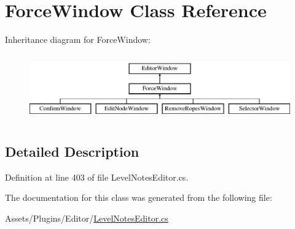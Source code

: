 \hypertarget{class_force_window}{}\section{Force\+Window Class Reference}
\label{class_force_window}
Inheritance diagram for Force\+Window\+:\begin{figure}[H]
\begin{center}
\leavevmode
\includegraphics[height=2.916667cm]{class_force_window}
\end{center}
\end{figure}


\subsection{Detailed Description}


Definition at line 403 of file Level\+Notes\+Editor.\+cs.



The documentation for this class was generated from the following file\+:\begin{DoxyCompactItemize}
\item 
Assets/\+Plugins/\+Editor/\mbox{\hyperlink{_level_notes_editor_8cs}{Level\+Notes\+Editor.\+cs}}\end{DoxyCompactItemize}
